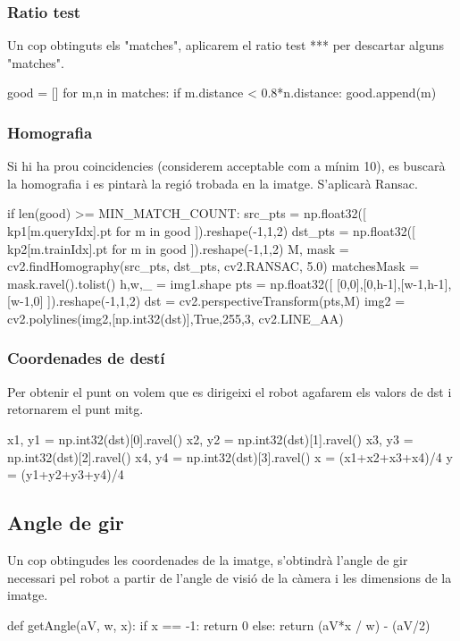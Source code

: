 		\subsubsection{Ratio test}
Un cop obtinguts els "matches", aplicarem el ratio test *** per descartar alguns "matches".\\
		\begin{python}
	good = []
	for m,n in matches:
		if m.distance < 0.8*n.distance:
			good.append(m)
		\end{python}

\newpage
		\subsubsection{Homografia}
Si hi ha prou coincidencies (considerem acceptable com a mínim 10), es buscarà la homografia i es pintarà la regió trobada en la imatge. S'aplicarà Ransac. \\
		\begin{python}
	if len(good) >= MIN_MATCH_COUNT:
		src_pts = np.float32([ kp1[m.queryIdx].pt for m in good ]).reshape(-1,1,2)
		dst_pts = np.float32([ kp2[m.trainIdx].pt for m in good ]).reshape(-1,1,2)
		M, mask = cv2.findHomography(src_pts, dst_pts, cv2.RANSAC, 5.0)
		matchesMask = mask.ravel().tolist()
		h,w,_ = img1.shape
		pts = np.float32([ [0,0],[0,h-1],[w-1,h-1],[w-1,0] ]).reshape(-1,1,2)
		dst = cv2.perspectiveTransform(pts,M)
		img2 = cv2.polylines(img2,[np.int32(dst)],True,255,3, cv2.LINE_AA)
		\end{python}

		\subsubsection{Coordenades de destí}
Per obtenir el punt on volem que es dirigeixi el robot agafarem els valors de dst i retornarem el punt mitg.\\
		\begin{python}
		x1, y1 = np.int32(dst)[0].ravel()
		x2, y2 = np.int32(dst)[1].ravel()
		x3, y3 = np.int32(dst)[2].ravel()
		x4, y4 = np.int32(dst)[3].ravel()
		x = (x1+x2+x3+x4)/4
		y = (y1+y2+y3+y4)/4
		\end{python}

	\subsection{Angle de gir}
		Un cop obtingudes les coordenades de la imatge, s'obtindrà l'angle de gir necessari pel robot a partir de l'angle de visió de la càmera i les dimensions de la imatge.\\
		\begin{python}
def getAngle(aV, w, x):
	if x == -1:
		return 0
	else:
		return (aV*x / w) - (aV/2)
		\end{python}

